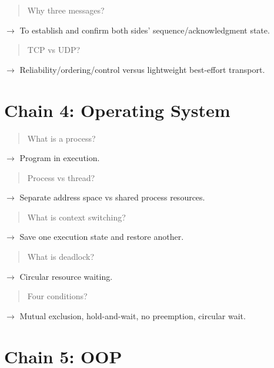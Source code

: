 \begin{quote}
Why three messages?\\
\end{quote}

$\rightarrow$ To establish and confirm both sides' sequence/acknowledgment state.

\begin{quote}
TCP vs UDP?\\
\end{quote}

$\rightarrow$ Reliability/ordering/control versus lightweight best-effort transport.

\medskip

\section{Chain 4: Operating System}

\begin{quote}
What is a process?\\
\end{quote}

$\rightarrow$ Program in execution.

\begin{quote}
Process vs thread?\\
\end{quote}

$\rightarrow$ Separate address space vs shared process resources.

\begin{quote}
What is context switching?\\
\end{quote}

$\rightarrow$ Save one execution state and restore another.

\begin{quote}
What is deadlock?\\
\end{quote}

$\rightarrow$ Circular resource waiting.

\begin{quote}
Four conditions?\\
\end{quote}

$\rightarrow$ Mutual exclusion, hold-and-wait, no preemption, circular wait.

\medskip

\section{Chain 5: OOP}

